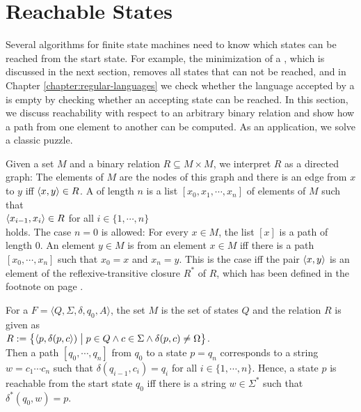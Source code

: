 \section{Reachable States \label{section:reachable}}
Several algorithms for finite state machines need to know which states can be reached from the start state.  For
example, the minimization of a , which is discussed in the next section, removes all states that
can not be reached, and in Chapter \ref{chapter:regular-languages} we check whether the language accepted by a
 is empty by checking whether an accepting state can be reached.  In this section, we discuss
reachability with respect to an arbitrary binary relation and show how a path from one element to another can be
computed.  As an application, we solve a classic puzzle.

Given a set $M$ and a binary relation $R \subseteq M \times M$, we interpret $R$ as a directed graph:  The elements
of $M$ are the nodes of this graph and there is an edge from $x$ to $y$ iff $\pair(x,y) \in R$.  A
 of length $n$ is a list $[x_0, x_1, \cdots, x_n]$ of elements of $M$ such that
\\[0.2cm]
\hspace*{1.3cm}
$\pair(x_{i-1}, x_i) \in R$ \quad for all $i \in \{1, \cdots, n\}$
\\[0.2cm]
holds.  The case $n = 0$ is allowed:  For every $x \in M$, the list $[x]$ is a path of length $0$.  An element
$y \in M$ is  from an element $x \in M$ iff there is a path
$[x_0, \cdots, x_n]$ such that $x_0 = x$ and $x_n = y$.  This is the case iff the pair $\pair(x,y)$ is an element of
the reflexive-transitive closure $R^*$ of $R$, which has been defined in the footnote on page
\pageref{footnote:rtc}.

For a  $F = \langle Q, \Sigma, \delta, q_0, A \rangle$, the set $M$ is the set of states $Q$ and
the relation $R$ is given as
\\[0.2cm]
\hspace*{1.3cm}
$R := \bigl\{ \pair(p, \delta(p, c)) \bigm| p \in Q \wedge c \in \Sigma \wedge \delta(p, c) \not= \Omega \bigr\}$.
\\[0.2cm]
Then a path $[q_0, \cdots, q_n]$ from $q_0$ to a state $p = q_n$ corresponds to a string $w = c_1 \cdots c_n$
such that $\delta(q_{i-1}, c_i) = q_i$ for all $i \in \{1, \cdots, n\}$.  Hence, a state $p$ is reachable from the
start state $q_0$ iff there is a string $w \in \Sigma^*$ such that $\delta^*(q_0, w) = p$.


